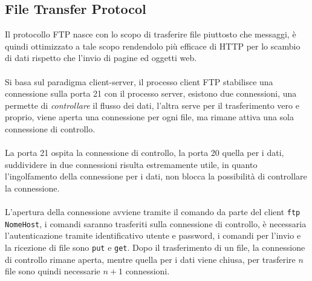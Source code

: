 \documentclass[12pt, letterpaper]{article}
\newcommand{\code}[1]{\colorbox{light-gray}{\texttt{#1}}}
\newcommand{\acc}{\\\hphantom{}\\}
\begin{document}
\subsection{File Transfer Protocol}
Il protocollo FTP nasce con lo scopo di trasferire file piuttosto che messaggi, è quindi ottimizzato a tale
scopo rendendolo più efficace di HTTP per lo scambio di dati rispetto che l'invio di pagine ed
oggetti web.\acc
Si basa sul paradigma client-server, il processo client FTP stabilisce una connessione
sulla porta 21 con il processo server, esistono due connessioni, una permette di \textit{controllare} il
flusso dei dati, l'altra serve per il trasferimento vero e proprio, viene aperta una connessione per ogni file,
ma rimane attiva una sola connessione di controllo.\acc
La porta 21 ospita la connessione di controllo, la porta 20 quella per i dati, suddividere in due connessioni
risulta estremamente utile, in quanto l'ingolfamento della connessione per i dati, non blocca la possibilità
di controllare la connessione.\acc L'apertura della connessione avviene tramite il comando da parte del
client \code{ftp NomeHost}, i comandi saranno trasferiti sulla connessione di controllo, è necessaria
l'autenticazione tramite identificativo utente e password, i comandi per l'invio e la ricezione di file sono
\code{put} e \code{get}. Dopo il trasferimento di un file, la connessione di controllo rimane aperta, mentre
quella per i dati viene chiusa, per trasferire $n$ file sono quindi necessarie $n+1$ connessioni.
\end{document}
